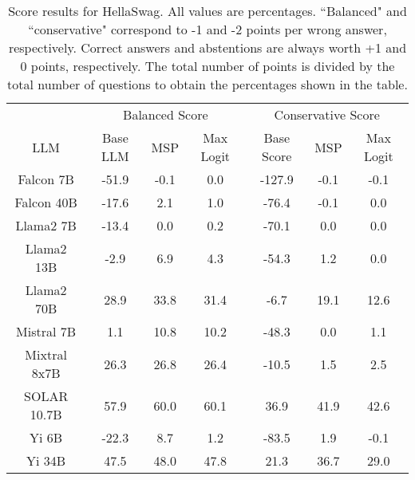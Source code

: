 \renewcommand\arraystretch{1.2}
\begin{table*}
\centering
\begin{tabular}{c|c|c|c|c|c|c}
& \multicolumn{3}{c|}{Balanced Score} & \multicolumn{3}{c}{Conservative Score} \\ 
LLM & Base LLM & MSP & Max Logit & Base Score & MSP & Max Logit\\ \hline
Falcon 7B & -51.9 & -0.1 & 0.0 & -127.9 & -0.1 & -0.1\\
Falcon 40B & -17.6 & 2.1 & 1.0 & -76.4 & -0.1 & 0.0\\
Llama2 7B & -13.4 & 0.0 & 0.2 & -70.1 & 0.0 & 0.0\\
Llama2 13B & -2.9 & 6.9 & 4.3 & -54.3 & 1.2 & 0.0\\
Llama2 70B & 28.9 & 33.8 & 31.4 & -6.7 & 19.1 & 12.6\\
Mistral 7B & 1.1 & 10.8 & 10.2 & -48.3 & 0.0 & 1.1\\
Mixtral 8x7B & 26.3 & 26.8 & 26.4 & -10.5 & 1.5 & 2.5\\
SOLAR 10.7B & 57.9 & 60.0 & 60.1 & 36.9 & 41.9 & 42.6\\
Yi 6B & -22.3 & 8.7 & 1.2 & -83.5 & 1.9 & -0.1\\
Yi 34B & 47.5 & 48.0 & 47.8 & 21.3 & 36.7 & 29.0\\
\hline
\end{tabular}
\caption{Score results for HellaSwag. All values are percentages. ``Balanced" and ``conservative" correspond to -1 and -2 points per wrong answer, respectively. Correct answers and abstentions are always worth +1 and 0 points, respectively. The total number of points is divided by the total number of questions to obtain the percentages shown in the table.}
\label{tab:hellaswag_score}
\end{table*}
